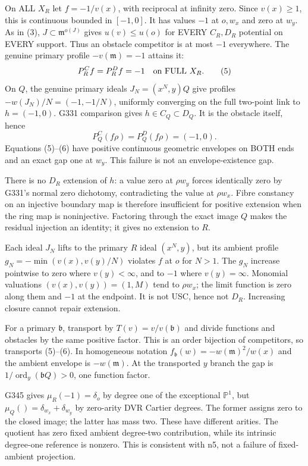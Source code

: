 On ALL $X_R$ let $f=-1/v(x)$, with reciprocal at infinity zero. Since $v(x)\ge1$, this is continuous bounded in $[-1,0]$. It has values $-1$ at $o,w_x$ and zero at $w_y$. As in (3), $J\subset\mathfrak m^{o(J)}$ gives $u(v)\le u(o)$ for EVERY $C_R,D_R$ potential on EVERY support. Thus an obstacle competitor is at most $-1$ everywhere. The genuine primary profile $-v(\mathfrak m)=-1$ attains it:
\[
 P_R^Cf=P_R^Df=-1\quad\hbox{on FULL }X_R. \tag{5}
\]
On $Q$, the genuine primary ideals $J_N=(x^N,y)Q$ give profiles $-w(J_N)/N=(-1,-1/N)$, uniformly converging on the full two-point link to $h=(-1,0)$. G331 comparison gives $h\in C_Q\subset D_Q$. It is the obstacle itself, hence
\[
 P_Q^C(f\rho)=P_Q^D(f\rho)=(-1,0). \tag{6}
\]
Equations (5)--(6) have positive continuous geometric envelopes on BOTH ends and an exact gap one at $w_y$. This failure is not an envelope-existence gap.

There is no $D_R$ extension of $h$: a value zero at $\rho w_y$ forces identically zero by G331's normal zero dichotomy, contradicting the value at $\rho w_x$. Fibre constancy on an injective boundary map is therefore insufficient for positive extension when the ring map is noninjective. Factoring through the exact image $Q$ makes the residual injection an identity; it gives no extension to $R$.

Each ideal $J_N$ lifts to the primary $R$ ideal $(x^N,y)$, but its ambient profile $g_N=-\min(v(x),v(y)/N)$ violates $f$ at $o$ for $N>1$. The $g_N$ increase pointwise to zero where $v(y)<\infty$, and to $-1$ where $v(y)=\infty$. Monomial valuations $(v(x),v(y))=(1,M)$ tend to $\rho w_x$; the limit function is zero along them and $-1$ at the endpoint. It is not USC, hence not $D_R$. Increasing closure cannot repair extension.

For a primary $\mathfrak b$, transport by $T(v)=v/v(\mathfrak b)$ and divide functions and obstacles by the same positive factor. This is an order bijection of competitors, so transports (5)--(6). In homogeneous notation $f_{\mathfrak b}(w)=-w(\mathfrak m)^2/w(x)$ and the ambient envelope is $-w(\mathfrak m)$. At the transported $y$ branch the gap is $1/\operatorname{ord}_y(\mathfrak bQ)>0$, one function factor.

G345 gives $\mu_R(-1)=\delta_o$ by degree one of the exceptional $\mathbb P^1$, but $\mu_Q()=\delta_{w_x}+\delta_{w_y}$ by zero-arity DVR Cartier degrees. The former assigns zero to the closed image; the latter has mass two. These have different arities. The quotient has zero fixed ambient degree-two contribution, while its intrinsic degree-one reference is nonzero. This is consistent with n5, not a failure of fixed-ambient projection.


